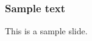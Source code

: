 \documentclass{beamer}
\begin{document}
\frame{\titlepage}

\begin{frame}
  \frametitle{Sample text}
  This is a sample slide. \\
  
\end{frame}
\end{document}
